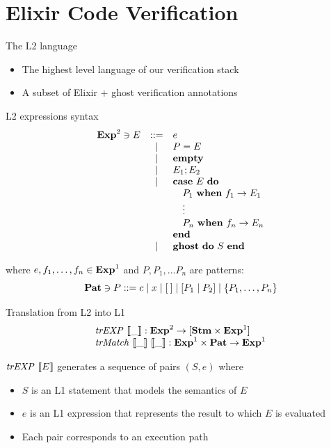 \documentclass{beamer}
\begin{document}
  \section{Elixir Code Verification}
  \begin{frame}{The L2 language}
    \begin{itemize}
      \item \pause The highest level language of our verification stack
      \item \pause A subset of Elixir + ghost verification annotations
    \end{itemize}
  \end{frame}
  \begin{frame}{L2 expressions syntax}
    \[
      \begin{array}{rcll}
      \mathbf{Exp}^{2} \ni E & ::= & e \\
      & | & P = E \\
      & | & \textbf{empty} \\
      & | & E_1; E_2 \\
      & | & \textbf{case}~E~\textbf{do} \\
      & & \quad P_1~\textbf{when}~f_1 \rightarrow E_1 \\
      & & \quad \vdots\\
      & & \quad P_n~\textbf{when}~f_n \rightarrow E_n \\
      & & \textbf{end} \\
      & | & \textbf{ghost}~\textbf{do}~S~\textbf{end} \\
      \end{array}
    \]

    \pause where $e, f_1, \dots, f_n \in \mathbf{Exp}^{1}$ and $P, P_1, \dots P_n$ are patterns:
    \[
      \mathbf{Pat} \ni P ::= c \mid x \mid [\:] \mid [P_1 \mid P_2] \mid \{ P_1, \ldots, P_n \}
    \]
  \end{frame}
  \begin{frame}{Translation from L2 into L1}
    \[
      \begin{array}{ll}
        \mathit{trEXP}~\llbracket\_\rrbracket : \mathbf{Exp}^{2} \rightarrow [\mathbf{Stm} \times \mathbf{Exp}^{1}]\\
        \mathit{trMatch}~\llbracket\_\rrbracket~\llbracket\_\rrbracket : \mathbf{Exp}^{1} \times \mathbf{Pat} \rightarrow \mathbf{Exp}^{1}
      \end{array}
    \]

    \pause $\mathit{trEXP}~\llbracket E\rrbracket$ generates a sequence of pairs $(S, e)$ where
    \begin{itemize}
      \item \pause $S$ is an L1 statement that models the semantics of $E$
      \item \pause $e$ is an L1 expression that represents the result to which $E$ is evaluated
      \item \pause Each pair corresponds to an execution path
    \end{itemize}
  \end{frame}
\end{document}
